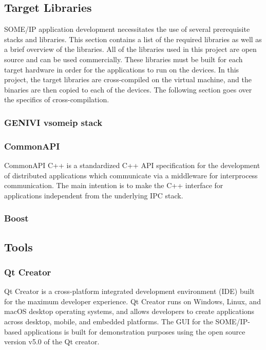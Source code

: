 \subsection{Target Libraries}
SOME/IP application development necessitates the use of several prerequisite stacks and libraries. This section contains a list of the required libraries as well as a brief overview of the libraries. All of the libraries used in this project are open source and can be used commercially. These libraries must be built for each target hardware in order for the applications to run on the devices. In this project, the target libraries are cross-compiled on the virtual machine, and the binaries are then copied to each of the devices. The following section goes over the specifics of cross-compilation.

\subsubsection{GENIVI vsomeip stack}
\subsubsection{CommonAPI}
CommonAPI C++ is a standardized C++ API specification for the development of distributed applications which communicate via a middleware for interprocess communication\cite{b_commonapi}. The main intention is to make the C++ interface for applications independent from the underlying IPC stack\cite{b_commonapi}.


\subsubsection{Boost}


\subsection{Tools}
\subsubsection{Qt Creator}
Qt Creator is a cross-platform integrated development environment (IDE) built for the maximum developer experience\cite{b_QtCreator}. Qt Creator runs on Windows, Linux, and macOS desktop operating systems, and allows developers to create applications across desktop, mobile, and embedded platforms\cite{b_QtCreator}. The GUI for the SOME/IP-based applications is built for demonstration purposes using the open source version v5.0 of the Qt creator.


